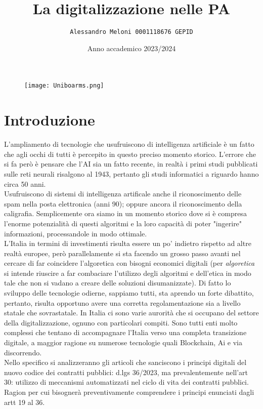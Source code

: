 \documentclass{article}
\title{\huge\textbf{La digitalizzazione nelle PA}}
\author{\texttt{Alessandro Meloni 0001118676 GEPID}}
\date{Anno accademico 2023/2024}
\begin{document}
\begin{figure}
    \centering
    \texttt{[image: Uniboarms.png]}
\end{figure}
\maketitle

\centering \tableofcontents

\newpage\centering
\section{Introduzione}
\begin{justify}
L'ampliamento di tecnologie che usufruiscono di intelligenza artificiale è un fatto che agli occhi di tutti è percepito in questo preciso momento storico. L'errore che si fa però è pensare che l'AI sia un fatto recente, in realtà i primi studi pubblicati sulle reti neurali risalgono al 1943, pertanto gli studi informatici a riguardo hanno circa 50 anni.\citep{mcculloch1943logical}\\ Usufruiscono di sistemi di intelligenza artificale anche il riconoscimento delle spam nella posta elettronica (anni 90); oppure ancora il riconoscimento della caligrafia. Semplicemente ora siamo in un momento storico dove si è compresa l'enorme potenzialità di questi algoritmi e la loro capacità di poter "ingerire" informazioni, processandole in modo ottimale.\\
L'Italia in termini di investimenti risulta essere un po' indietro rispetto ad altre realtà europee, però parallelamente si sta facendo un grosso passo avanti nel cercare di far coincidere l'algoretica con bisogni economici digitali (per \textit{algoretica} si intende riuscire a far combaciare l'utilizzo degli algoritmi e dell'etica in modo tale che non si vadano a creare delle soluzioni disumanizzate).
Di fatto lo sviluppo delle tecnologie odierne, sappiamo tutti, sta aprendo un forte dibattito, pertanto, risulta opportuno avere una corretta regolamentazione sia a livello statale che sovrastatale.
In Italia ci sono varie aurorità che si occupano del settore della digitalizzazione, ognuno con particolari compiti.
Sono tutti enti molto complessi che tentano di accompagnare l'Italia verso una completa transizione digitale, a maggior ragione su numerose tecnologie quali Blockchain, Ai e via discorrendo.\\
Nello specifico si analizzeranno gli articoli che sanciscono i principi digitali del nuovo codice dei contratti pubblici: d.lgs 36/2023, ma prevalentemente nell'art 30: utilizzo di meccanismi automatizzati nel ciclo di vita dei contratti pubblici. Ragion per cui bisognerà preventivamente comprendere i principi enunciati dagli artt 19 al 36.\\

\end{justify}
\end{document}
